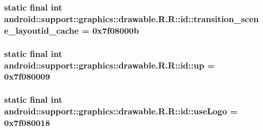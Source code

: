 \hypertarget{classandroid_1_1support_1_1graphics_1_1drawable_1_1_r_1_1id_439164a77dd8f00009561da761463455}{
\subsubsection[{transition\_\-scene\_\-layoutid\_\-cache}]{\setlength{\rightskip}{0pt plus 5cm}static final int android::support::graphics::drawable.R.R::id::transition\_\-scene\_\-layoutid\_\-cache = 0x7f08000b}}
\label{classandroid_1_1support_1_1graphics_1_1drawable_1_1_r_1_1id_439164a77dd8f00009561da761463455}


\hypertarget{classandroid_1_1support_1_1graphics_1_1drawable_1_1_r_1_1id_33dbd54841c3249d3d2b1a6db81da22d}{
\subsubsection[{up}]{\setlength{\rightskip}{0pt plus 5cm}static final int android::support::graphics::drawable.R.R::id::up = 0x7f080009}}
\label{classandroid_1_1support_1_1graphics_1_1drawable_1_1_r_1_1id_33dbd54841c3249d3d2b1a6db81da22d}


\hypertarget{classandroid_1_1support_1_1graphics_1_1drawable_1_1_r_1_1id_03ae20d8767897a4d5aa456c410b19d8}{
\subsubsection[{useLogo}]{\setlength{\rightskip}{0pt plus 5cm}static final int android::support::graphics::drawable.R.R::id::useLogo = 0x7f080018}}
\label{classandroid_1_1support_1_1graphics_1_1drawable_1_1_r_1_1id_03ae20d8767897a4d5aa456c410b19d8}


